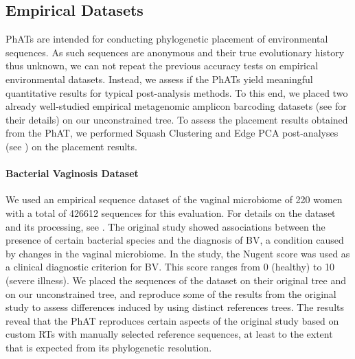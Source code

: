 
\subsection{Empirical Datasets}
\label{ch:AutomaticTrees:sec:Evaluation:sub:EmpiricalDatasets}

\acp{PhAT} are intended for conducting phylogenetic placement of environmental sequences.
As such sequences are anonymous and their true evolutionary history thus unknown,
we can not repeat the previous accuracy tests on empirical environmental datasets.
Instead, we assess if the \acp{PhAT} yield meaningful quantitative results for typical post-analysis methods.
To this end, we placed two already well-studied empirical metagenomic amplicon barcoding datasets
(see  for their details) on our unconstrained  tree.
To assess the placement results obtained from the \ac{PhAT},
we performed Squash Clustering and Edge PCA \cite{Matsen2011a} post-analyses
(see ) on the placement results.


\paragraph{Bacterial Vaginosis Dataset}
\label{ch:AutomaticTrees:sec:Evaluation:sub:EmpiricalDatasets:par:BV}

We used an empirical sequence dataset of the vaginal microbiome of 220 women
with a total of \num{426 612} sequences \cite{Srinivasan2012} for this evaluation.
For details on the dataset and its processing, see .
The original study showed associations between the presence of certain bacterial species
and the diagnosis of \acf{BV}, a condition caused by changes in the vaginal microbiome.
In the study, the Nugent score \cite{Nugent1991} was used as a clinical diagnostic criterion for \ac{BV}.
This score ranges from \num{0} (healthy) to \num{10} (severe illness).
We placed the sequences of the dataset on their original tree and on our unconstrained  tree,
and reproduce some of the results from the original study
to assess differences induced by using distinct references trees.
The results reveal that the \ac{PhAT} reproduces certain aspects of the original study %
based on custom \acp{RT} with manually selected reference sequences,
at least to the extent that is expected from its phylogenetic resolution.

